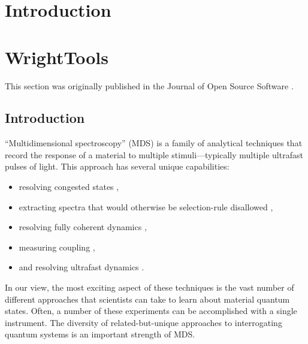 
\clearpage

\section{Introduction}  %


\clearpage

\section{WrightTools}  %

This section was originally published in the Journal of Open Source Software \cite{ThompsonBlaiseJonathan2019a}.

\hypertarget{introduction}{%
\subsection{Introduction}\label{introduction}}

``Multidimensional spectroscopy'' (MDS) is a family of analytical
techniques that record the response of a material to multiple
stimuli---typically multiple ultrafast pulses of light. This approach
has several unique capabilities:

\begin{itemize}
\item
	resolving congested states \cite{ZhaoWei1999b}\cite{DonaldsonPaulMurray2008a},
\item
  extracting spectra that would otherwise be selection-rule disallowed
		\cite{BoyleErinSelene2013b}\cite{BoyleErinSelene2014a},
\item
  resolving fully coherent dynamics \cite{PakoulevAndreiV2009a},
\item
  measuring coupling \cite{WrightJohnCurtis2011a},
\item
	and resolving ultrafast dynamics \cite{SmallwoodChristopherL2018a}\cite{CzechKyleJonathan2015a}.
\end{itemize}

In our view, the most exciting aspect of these techniques is the vast
number of different approaches that scientists can take to learn about
material quantum states. Often, a number of these experiments can be
accomplished with a single instrument. The diversity of
related-but-unique approaches to interrogating quantum systems is an
important strength of MDS.

